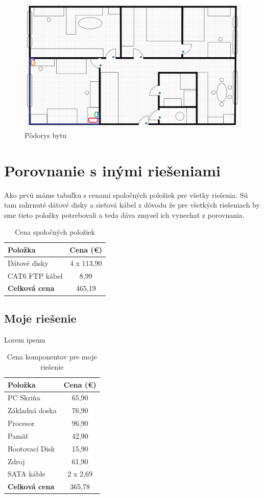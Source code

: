 \documentclass[12pt,oneside,slovak,a4paper]{article}
\begin{document}
\begin{figure}[H]
	\centering
	\captionsetup{justification=centering,margin=2cm}
	\includegraphics[width=\linewidth]{./images/nakres-bytu.png}
	\centering
	\caption{Pôdorys bytu}
	\label{fig:floorplan}
\end{figure}


\section{Porovnanie s inými riešeniami}
Ako prvú máme tabuľku s cenami spoločných položiek pre všetky riešenia. Sú tam zahrnuté dátové disky a sieťová kábel z dôvodu že pre všetkých riešeniach by sme tieto položky potrebovali a teda dáva zmysel ich vynechať z porovnania.

\begin{table}[h]
\centering
\begin{tabular}{|l|c|}
\hline
\textbf{Položka} & \textbf{Cena (€)} \\ \hline
Dátové disky & 4 x 113,90 \\ \hline
CAT6 FTP kábel & 8,99 \\ \hline
\textbf{Celková cena} & 465,19\\ \hline
\end{tabular}
\caption{Cena spoločných položiek}
\end{table}

\subsection{Moje riešenie}
Lorem ipsum

\begin{table}[h]
\centering
\begin{tabular}{|l|c|}
\hline
\textbf{Položka} & \textbf{Cena (€)} \\ \hline
PC Skriňa & 65,90 \\ \hline
Základná doska & 76,90 \\ \hline
Procesor & 96,90 \\ \hline
Pamäť & 42,90 \\ \hline
Bootovací Disk & 15,90 \\ \hline
Zdroj & 61,90 \\ \hline
SATA káble & 2 x 2,69 \\ \hline
\textbf{Celková cena} & 365,78 \\ \hline
\end{tabular}
\caption{Cena komponentov pre moje riešenie}
\end{table}
\end{document}
